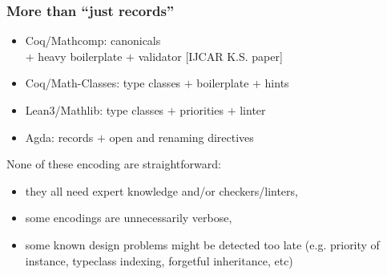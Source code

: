 \documentclass[11pt]{beamer}
\begin{document}
\begin{frame}
  \frametitle{More than ``just records''}



  \begin{itemize}
  \item {\sc Coq/Mathcomp}:     canonicals \alert<1>{\\
      $+$ heavy boilerplate $+$ validator [IJCAR K.S. paper]}
  \item {\sc Coq/Math-Classes}: type classes \alert<1>{$+$ boilerplate $+$ hints}
  \item {\sc Lean3/Mathlib}:     type classes \alert<1>{$+$ priorities $+$ linter}
  \item {\sc Agda}:             records \alert<1>{$+$ open and renaming directives}
  \end{itemize}

  \vfill
  \pause
  \vfill

  None of these encoding are straightforward:
  \begin{itemize}
  \item they all need expert knowledge and/or checkers/linters,
  \item some encodings are unnecessarily verbose,
  \item some known design problems might be detected too late
    (e.g. priority of instance, typeclass indexing, forgetful
    inheritance, etc)
  \end{itemize}


  \vfill
  \pause
\end{frame}
\end{document}
